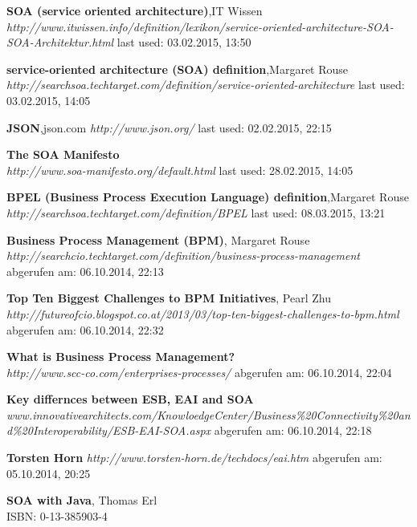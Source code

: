 \documentclass[12pt]{article}
\begin{document}
\begin{thebibliography}{56}
     
   \textbf{SOA (service oriented architecture)},IT Wissen \\
  \textit{http://www.itwissen.info/definition/lexikon/service-oriented-architecture-SOA-SOA-Architektur.html}
  \newline last used: 03.02.2015, 13:50
     
   \textbf{service-oriented architecture (SOA) definition},Margaret Rouse \\
  \textit{http://searchsoa.techtarget.com/definition/service-oriented-architecture}
  \newline last used: 03.02.2015, 14:05

   \textbf{JSON},json.com
  \textit{http://www.json.org/}
  \newline last used: 02.02.2015, 22:15

 
   \textbf{The SOA Manifesto} \\
  \textit{http://www.soa-manifesto.org/default.html}
  \newline last used: 28.02.2015, 14:05


   \textbf{BPEL (Business Process Execution Language) definition},Margaret Rouse \\
  \textit{http://searchsoa.techtarget.com/definition/BPEL}
  \newline last used: 08.03.2015, 13:21

   \textbf{Business Process Management (BPM)}, Margaret Rouse\\
  \emph{http://searchcio.techtarget.com/definition/business-process-management}
  \newline abgerufen am: 06.10.2014, 22:13
  

   \textbf{Top Ten Biggest Challenges to BPM Initiatives}, Pearl Zhu\\
  \emph{http://futureofcio.blogspot.co.at/2013/03/top-ten-biggest-challenges-to-bpm.html}
  \newline abgerufen am: 06.10.2014, 22:32
 
 
   \textbf{What is Business Process Management? }\\
  \emph{http://www.scc-co.com/enterprises-processes/}
  \newline abgerufen am: 06.10.2014, 22:04


   \textbf{Key differnces between ESB, EAI and SOA}\\
  \emph{www.innovativearchitects.com/KnowloedgeCenter/Business\%20Connectivity\%20and\%20Interoperability/ESB-EAI-SOA.aspx}
  \newline abgerufen am: 06.10.2014, 22:18


   \textbf{Torsten Horn}\newline
  \emph{http://www.torsten-horn.de/techdocs/eai.htm}
  \newline abgerufen am: 05.10.2014, 20:25


   \textbf{SOA with Java}, Thomas Erl \\
 	 ISBN: 0-13-385903-4
\end{thebibliography}
\end{document}

